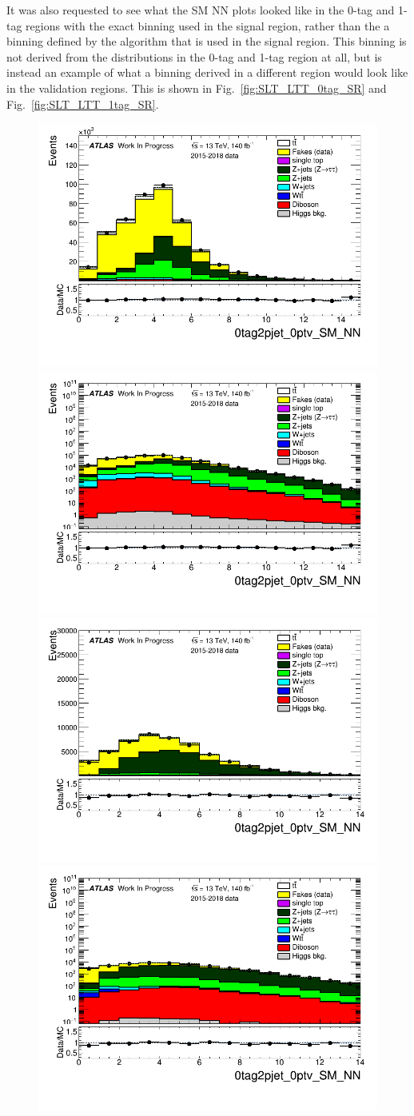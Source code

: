 It was also requested to see what the SM NN plots looked like in the 0-tag and 1-tag regions with the exact binning used in the signal region, rather than the a binning defined by the algorithm that is used in the signal region.  This binning is not derived from the distributions in the 0-tag and 1-tag region at all, but is instead an example of what a binning derived in a different region would look like in the validation regions.  This is shown in Fig.~\ref{fig:SLT_LTT_0tag_SR} and Fig.~\ref{fig:SLT_LTT_1tag_SR}.  

\begin{figure}
\centering
\includegraphics[width=.45\textwidth]{DiHiggs/plots/lephadFF/SLT/0tag2pjet_0ptv_SM_NN_SLT_ALLFAKES_Bulb_SRbinning_lin.png}
\includegraphics[width=.45\textwidth]{DiHiggs/plots/lephadFF/SLT/0tag2pjet_0ptv_SM_NN_SLT_ALLFAKES_Bulb_SRbinning_log.png}\\
\includegraphics[width=.45\textwidth]{DiHiggs/plots/lephadFF/LTT/0tag2pjet_0ptv_SM_NN_LTT_ALLFAKES_Bulb_SRbinning_lin.png}
\includegraphics[width=.45\textwidth]{DiHiggs/plots/lephadFF/LTT/0tag2pjet_0ptv_SM_NN_LTT_ALLFAKES_Bulb_SRbinning_log.png}\\

\end{figure}
